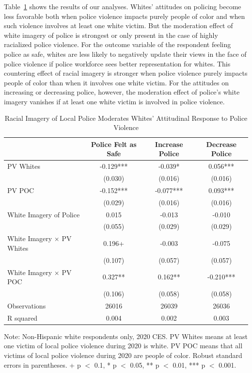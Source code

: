 \documentclass[
  12pt,
]{article}
\begin{document}
Table~\ref{tbl-racial.component} shows the results of our analyses.
Whites' attitudes on policing become less favorable both when police
violence impacts purely people of color and when such violence involves
at least one white victim. But the moderation effect of white imagery of
police is strongest or only present in the case of highly racialized
police violence. For the outcome variable of the respondent feeling
police as safe, whites are less likely to negatively update their views
in the face of police violence if police workforce sees better
representation for whites. This countering effect of racial imagery is
stronger when police violence purely impacts people of color than when
it involves one white victim. For the attitudes on increasing or
decreasing police, however, the moderation effect of police's white
imagery vanishes if at least one white victim is involved in police
violence.

\hypertarget{tbl-racial.component}{}
\begin{table}
\caption{\label{tbl-racial.component}Racial Imagery of Local Police Moderates Whites' Attitudinal Response to
Police Violence }\tabularnewline

\centering
\begin{threeparttable}
\begin{tabular}[t]{lccc}
\toprule
  & Police Felt as Safe & Increase Police & Decrease Police\\
\midrule
PV Whites & -0.129*** & -0.039* & 0.056***\\
 & (0.030) & (0.016) & (0.016)\\
PV POC & -0.152*** & -0.077*** & 0.093***\\
 & (0.029) & (0.016) & (0.016)\\
White Imagery of Police & 0.015 & -0.013 & -0.010\\
 & (0.055) & (0.029) & (0.029)\\
White Imagery × PV Whites & 0.196+ & -0.003 & -0.075\\
 & (0.107) & (0.057) & (0.057)\\
White Imagery × PV POC & 0.327** & 0.162** & -0.210***\\
 & (0.106) & (0.058) & (0.058)\\
\midrule
Observations & 26016 & 26039 & 26036\\
R squared & 0.004 & 0.002 & 0.003\\
\bottomrule
\end{tabular}
\begin{tablenotes}
\item Note: Non-Hispanic white respondents only, 2020 CES. PV Whites means at least one victim of local police violence during 2020 is white. PV POC means that all victims of local police violence during 2020 are people of color. Robust standard errors in parentheses. + p $<$ 0.1, * p $<$ 0.05, ** p $<$ 0.01, *** p $<$ 0.001.
\end{tablenotes}
\end{threeparttable}
\end{table}
\end{document}
